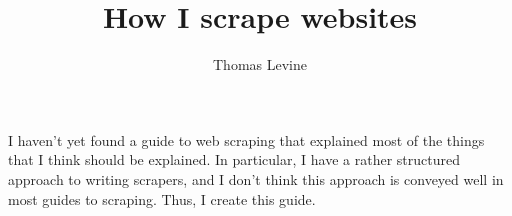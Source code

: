 \documentclass{article}
\title{How I scrape websites}
\author{Thomas Levine}
\begin{document}
I haven't yet found a guide to web scraping that explained most of
the things that I think should be explained. In particular, I have
a rather structured approach to writing scrapers, and I don't think
this approach is conveyed well in most guides to scraping. Thus, I
create this guide.
\end{document}
